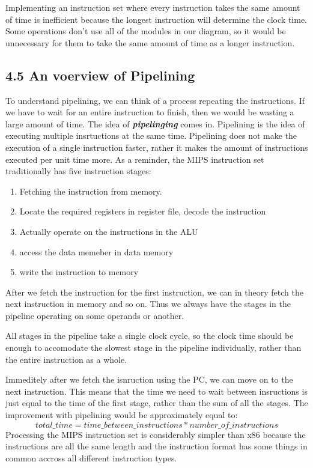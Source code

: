 \documentclass{article}
\begin{document}
Implementing an instruction set where every instruction takes the same amount of time is inefficient because
the longest instruction will determine the clock time. Some operations don't use all of the modules in our
diagram, so it would be unnecessary for them to take the same amount of time as a longer instruction.
\subsection{4.5 An voerview of Pipelining}
To understand pipelining, we can think of a process repeating the instructions. If we have to wait for an entire
instruction to finish, then we would be wasting a large amount of time. The idea of \textit{\textbf{pipelinging}}
comes in. Pipelining is the idea of executing multiple insrtuctions at the same time. Pipelining does not 
make the execution of a single instruction faster, rather it makes the amount of instructions executed per 
unit time more.
As a reminder, the MIPS instruction set traditionally has five instruction stages:
\begin{enumerate}
		\item{Fetching the instruction from memory.}
		\item{Locate the required registers in register file, decode the instruction}
		\item{Actually operate on the instructions in the ALU}
		\item{access the data memeber in data memory}
		\item{write the instruction to memory}
\end{enumerate}
After we fetch the instruction for the first instruction, we can in theory fetch the next instruction in memory and
so on. Thus we always have the stages in the pipeline operating on some operands or another.

All stages in the pipeline take a single clock cycle, so the clock time should be enough to accomodate the slowest
stage in the pipeline individually, rather than the entire instruction as a whole.

Immeditely after we fetch the isnruction using the PC, we can move on to the next instruction. This means that
the time we need to wait between insructions is just equal to the time of the first stage, rather than the sum
of all the stages. The improvement with pipelining would be approximately equal to:
\begin{equation}
		total\_time=time\_between\_instructions * number\_of\_instructions
\end{equation}
Processing the MIPS instruction set is considerably simpler than x86 because the instructions are all the same 
length and the instruction format has some things in common accross all different instruction types. 
\end{document}
